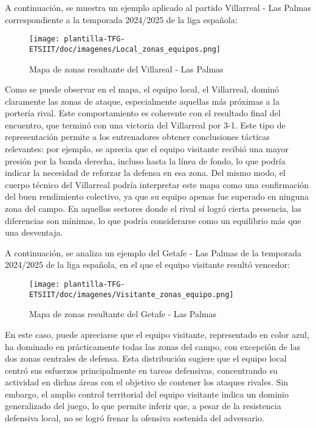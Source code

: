 A continuación, se muestra un ejemplo aplicado al partido Villarreal - Las Palmas correspondiente a la temporada 2024/2025 de la liga española:

\begin{figure}[H]
    \centering
    \texttt{[image: plantilla-TFG-ETSIIT/doc/imagenes/Local\_zonas\_equipos.png]}
    \caption{Mapa de zonas resultante del Villareal - Las Palmas}
    \label{fig:etiqueta-imagen}
\end{figure}

Como se puede observar en el mapa, el equipo local, el Villarreal, dominó claramente las zonas de ataque, especialmente aquellas más próximas a la portería rival. Este comportamiento es coherente con el resultado final del encuentro, que terminó con una victoria del Villarreal por 3-1. Este tipo de representación permite a los entrenadores obtener conclusiones tácticas relevantes: por ejemplo, se aprecia que el equipo visitante recibió una mayor presión por la banda derecha, incluso hasta la línea de fondo, lo que podría indicar la necesidad de reforzar la defensa en esa zona.
Del mismo modo, el cuerpo técnico del Villarreal podría interpretar este mapa como una confirmación del buen rendimiento colectivo, ya que su equipo apenas fue superado en ninguna zona del campo. En aquellos sectores donde el rival sí logró cierta presencia, las diferencias son mínimas, lo que podría considerarse como un equilibrio más que una desventaja.

A continuación, se analiza un ejemplo del Getafe - Las Palmas de la temporada 2024/2025 de la liga española, en el que el equipo visitante resultó vencedor:

\begin{figure}[H]
    \centering
    \texttt{[image: plantilla-TFG-ETSIIT/doc/imagenes/Visitante\_zonas\_equipo.png]}
    \caption{Mapa de zonas resultante del Getafe - Las Palmas}
    \label{fig:etiqueta-imagen}
\end{figure}

En este caso, puede apreciarse que el equipo visitante, representado en color azul, ha dominado en prácticamente todas las zonas del campo, con excepción de las dos zonas centrales de defensa. Esta distribución sugiere que el equipo local centró sus esfuerzos principalmente en tareas defensivas, concentrando su actividad en dichas áreas con el objetivo de contener los ataques rivales. Sin embargo, el amplio control territorial del equipo visitante indica un dominio generalizado del juego, lo que permite inferir que, a pesar de la resistencia defensiva local, no se logró frenar la ofensiva sostenida del adversario.

